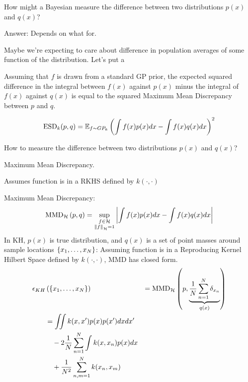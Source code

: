 \documentclass[usenames,dvipsnames]{beamer}
\begin{document}
\begin{frame}[plain, t]
	\titlebodyskip
	

	\slidebody
	{
		How might a Bayesian measure the difference between two distributions $p(x)$ and $q(x)$?
		
		Answer:  Depends on what for.
		
		Maybe we're expecting to care about difference in population averages of some function of the distribution.  Let's put a 
		
Assuming that $f$ is drawn from a standard GP prior, the expected squared difference in the integral between $f(x)$ against $p(x)$ minus the integral of $f(x)$ against $q(x)$ is equal to the squared Maximum Mean Discrepancy between $p$ and $q$.

\begin{align*}
	{\rm ESD}_k(p,q) &= \mathbb{E}_{f\sim GP_k} \left( \int f(x) p(x) dx - \int f(x) q(x) dx \right)^2\\
\end{align*}

	}
\end{frame}



\begin{frame}[plain, t]
	\titlebodyskip
	

	\slidebody
	{
		How to measure the difference between two distributions $p(x)$ and $q(x)$?
		
		Maximum Mean Discrepancy.
		
		Assumes function is in a RKHS defined by $k(\cdot , \cdot)$		
		
		Maximum Mean Discrepancy:
		\begin{align*}
			{\rm MMD}_{\mathcal{H}}\left(p,q\right) = \sup_{\substack{f\in\mathcal{H}\\\left\|f\right\|_{\mathcal{H}}=1}}\left\vert\int f(x) p(x) dx - \int f(x) q(x) dx \right\vert
		\end{align*}
		\pause
		In KH, $p(x)$ is true distribution, and $q(x)$ is a set of point masses around sample locations $\{{x}_1,\ldots,{x}_{N}\}$:
		Assuming function is in a Reproducing Kernel Hilbert Space defined by $k(\cdot , \cdot)$, MMD has closed form.
		\begin{align*}
			\epsilon_{KH}&\left(\{{x}_1,\ldots,{x}_{N}\}\right) & = 
			{\rm MMD}_{\mathcal{H}}\left(p, \underbrace{\frac{1}{N}\sum_{n=1}^{N}\delta_{x_n}}_{q(x)}\right) \\
		 	& = \int \!\!\! \int k({x}, {x}') p(x) p(x') dx dx' \\
			& \quad -2 \frac{1}{N}\sum_{n=1}^{N}\int k(x,x_n) p(x) dx \\
			& \quad + \frac{1}{N^2}\sum_{n,m=1}^{N} k(x_n,x_m)
		\end{align*}
	}
\end{frame}
\end{document}
